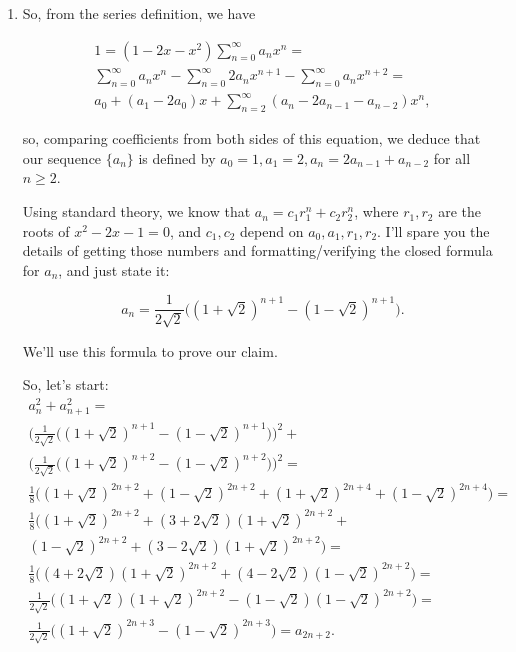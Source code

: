 \documentclass{article}
\begin{document}
\begin{enumerate}
\item So, from the series definition, we have

\begin{eqnarray*}
1 = (1 - 2x -x^2)\sum_{n = 0}^{\infty}a_n x^n = \\
\sum_{n = 0}^{\infty}a_n x^n - \sum_{n = 0}^{\infty}2a_n x^{n + 1} - \sum_{n = 0}^{\infty}a_n x^{n + 2} = \\
a_0 + (a_1 - 2a_0)x + \sum_{n = 2}^{\infty}(a_n -2a_{n - 1} - a_{n - 2}) x^n,
\end{eqnarray*}

so, comparing coefficients from both sides of this equation, we deduce that our
sequence $\{a_n\}$ is defined by $a_0 = 1, a_1 = 2, a_n = 2a_{n - 1} + a_{n - 2}$
for all $n \geq 2$.


Using standard theory, we know that $a_n = c_1r_1^n + c_2r_2^n$, where $r_1, r_2$ are the roots of $x^2 - 2x - 1 = 0$, and $c_1, c_2$ depend on $a_0, a_1, r_1, r_2$. I'll spare you the details of getting those numbers and formatting/verifying the closed formula for $a_n$, and just state it:

$$
	a_n = \frac{1}{2\sqrt2}\bigl((1 + \sqrt{2})^{n + 1} - (1 - \sqrt{2})^{n + 1}\bigr).
$$

We'll use this formula to prove our claim.

So, let's start:
\begin{eqnarray*}
a_n^2 + a_{n + 1}^2 = \\
\bigl(\frac{1}{2\sqrt2}\bigl((1 + \sqrt{2})^{n + 1} - (1 - \sqrt{2})^{n + 1}\bigr)\bigr)^2 + \\
\bigl(\frac{1}{2\sqrt2}\bigl((1 + \sqrt{2})^{n + 2} - (1 - \sqrt{2})^{n + 2}\bigr)\bigr)^2 = \\
\frac{1}{8}\bigl( (1 + \sqrt{2})^{2n + 2} + (1 - \sqrt{2})^{2n + 2} + (1 + \sqrt{2})^{2n + 4} + (1 - \sqrt{2})^{2n + 4}\bigr) = \\ 
\frac{1}{8}\bigl((1 + \sqrt{2})^{2n + 2} + (3 + 2\sqrt{2})(1 + \sqrt{2})^{2n + 2} + \\
(1 - \sqrt{2})^{2n + 2} + (3 - 2\sqrt{2})(1 + \sqrt{2})^{2n + 2}\bigr) = \\
\frac{1}{8}\bigl((4 + 2\sqrt{2})(1 + \sqrt{2})^{2n + 2} + (4 - 2\sqrt{2})(1 - \sqrt{2})^{2n + 2}\bigr) = \\
\frac{1}{2\sqrt2}\bigl((1 + \sqrt{2})(1 + \sqrt{2})^{2n + 2} - (1 - \sqrt{2})(1 - \sqrt{2})^{2n + 2}\bigr) = \\
\frac{1}{2\sqrt2}\bigl((1 + \sqrt{2})^{2n + 3} - (1 - \sqrt{2})^{2n + 3}\bigr) = a_{2n + 2}.
\end{eqnarray*}

\end{enumerate}
\end{document}
